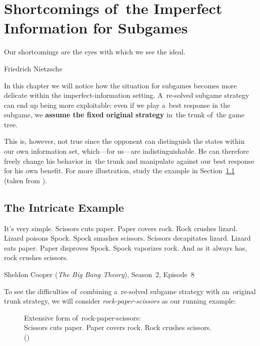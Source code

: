 \chapter{Shortcomings of~the Imperfect Information for Subgames}
{
  \setlength{\epigraphwidth}{0.75\textwidth}
  \epigraph{
    Our shortcomings are the eyes with which we see the ideal.
  }{Friedrich Nietzsche}
}%
In this chapter we will notice how the situation for subgames becomes more delicate within the imperfect-information setting.
A~re-solved subgame strategy can end up being more exploitable:
even if we play a~best response in the subgame, we \textbf{assume the fixed original strategy} in~the trunk of~the game tree.

This is, however, not true since the opponent can distinguish the states within our own information set, which---for us---are indistinguishable.
He can therefore freely change his behavior in~the trunk and manipulate against our best response for his own benefit.
For more illustration, study the example in Section~\ref{sec:intricate-ex} (taken from \cite{BurchJohansonBowling13}).

\section{The Intricate Example}
\label{sec:intricate-ex}
{
  \setlength{\epigraphwidth}{0.75\textwidth}
  \epigraph{
    It's very simple.
    Scissors cuts paper.
    Paper covers rock.
    Rock crushes lizard.
    Lizard poisons Spock.
    Spock smashes scissors.
    Scissors decapitates lizard.
    Lizard eats paper.
    Paper disproves Spock.
    Spock vaporizes rock.
    And as it always has, rock crushes scissors.
  }{Sheldon Cooper (\emph{The Big Bang Theory}), Season~2, Episode~8}
}%
To see the difficulties of~combining a~re-solved subgame strategy with an~original trunk strategy, we will consider \emph{rock-paper-scissors}\footnotemark{} as our running example:
\begin{figure}[H]
  \centering
  \scriptsize
  \def\svgwidth{.45\textwidth}
  
  \def\captionTitle{Extensive form of~rock-paper-scissors}
  \caption[\captionTitle]{\captionTitle:\\ Scissors cuts paper. Paper covers rock. Rock crushes scissors. \\(\cite{BurchJohansonBowling13})}
  \label{fig:game-tree-rock-paper-scissors}
\end{figure}


